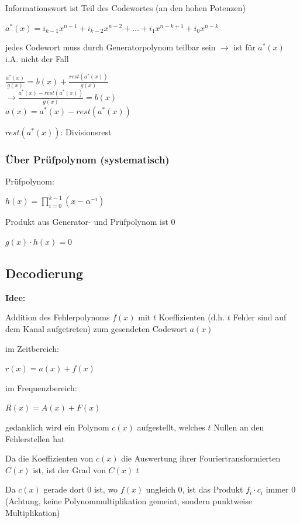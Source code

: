 Informationswort ist Teil des Codewortes (an den hohen Potenzen)

$\displaystyle{
    a^*(x) = i_{k-1} x^{n-1} + i_{k-2} x^{n-2} + ... + i_1 x^{n-k+1} + i_0 x^{n-k}
}$

jedes Codewort muss durch Generatorpolynom teilbar sein $\rightarrow$ ist
für $a^*(x)$ i.A. nicht der Fall

$\displaystyle{
    \frac{a^*(x)}{g(x)} = b(x) + \frac{rest(a^*(x))}{g(x)}
}$\\
$\displaystyle{
    \rightarrow \frac{a^*(x) - rest(a^*(x))}{g(x)} = b(x)
}$\\
$\displaystyle{
    a(x) = a^*(x) - rest(a^*(x))
}$

$rest(a^*(x))$: Divisionsrest

\subsubsection{Über Prüfpolynom (systematisch)}

Prüfpolynom:

$\displaystyle{
    h(x) = \prod_{i=0}^{k-1} (x - \alpha^{-i})
}$

Produkt aus Generator- und Prüfpolynom ist 0

$\displaystyle{
    g(x) \cdot h(x) = 0
}$

\subsection{Decodierung}

\textbf{Idee:}

Addition des Fehlerpolynoms $f(x)$ mit $t$ Koeffizienten (d.h. $t$ Fehler sind auf dem Kanal aufgetreten)
zum gesendeten Codewort $a(x)$

im Zeitbereich:

$\displaystyle{
    r(x) = a(x) + f(x)
}$

im Frequenzbereich:

$\displaystyle{
    R(x) = A(x) + F(x)
}$

gedanklich wird ein Polynom $c(x)$ aufgestellt, welches $t$ Nullen an den Fehlerstellen hat

Da die Koeffizienten von $c(x)$ die Auswertung ihrer Fouriertransformierten $C(x)$ ist, ist der Grad
von $C(x)$ $t$

Da $c(x)$ gerade dort 0 ist, wo $f(x)$ ungleich 0, ist das Produkt $f_i \cdot c_i$ immer 0 (Achtung, keine
Polynommultiplikation gemeint, sondern punktweise Multiplikation)

